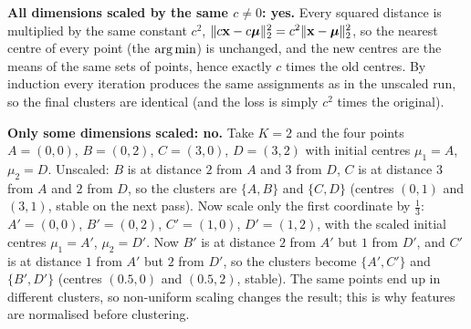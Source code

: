 \begin{solution}
\textbf{All dimensions scaled by the same $c\neq0$: yes.} Every squared distance is multiplied by the same
constant $c^2$, $\| c\mathbf{x}-c\bm\mu\|_{2}^2=c^2\| \mathbf{x}-\bm\mu\|_{2}^2$, so the nearest centre of every point
(the $\operatorname*{arg\,min}$) is unchanged, and the new centres are the means of the same sets of points, hence exactly $c$
times the old centres. By induction every iteration produces the same assignments as in the unscaled run, so
the final clusters are identical (and the loss is simply $c^2$ times the original).

\textbf{Only some dimensions scaled: no.} Take $K=2$ and the four points
$A=(0,0)$, $B=(0,2)$, $C=(3,0)$, $D=(3,2)$ with initial centres $\mu_1=A$, $\mu_2=D$.
Unscaled: $B$ is at distance $2$ from $A$ and $3$ from $D$, $C$ is at distance $3$ from $A$ and $2$ from $D$, so
the clusters are $\{A,B\}$ and $\{C,D\}$ (centres $(0,1)$ and $(3,1)$, stable on the next pass).
Now scale only the first coordinate by $\tfrac13$: $A'=(0,0)$, $B'=(0,2)$, $C'=(1,0)$, $D'=(1,2)$, with the
scaled initial centres $\mu_1=A'$, $\mu_2=D'$. Now $B'$ is at distance $2$ from $A'$ but $1$ from $D'$, and $C'$
is at distance $1$ from $A'$ but $2$ from $D'$, so the clusters become $\{A',C'\}$ and $\{B',D'\}$ (centres
$(0.5,0)$ and $(0.5,2)$, stable). The same points end up in different clusters, so non-uniform scaling
changes the result; this is why features are normalised before clustering.
\end{solution}
